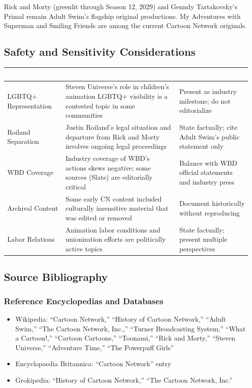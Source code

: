 \documentclass[11pt,letterpaper]{article}
\newcommand{\tableheader}[1]{\textbf{\sffamily\textcolor{white}{#1}}}
\begin{document}
Rick and Morty (greenlit through Season 12, 2029) and Genndy Tartakovsky's Primal remain Adult Swim's flagship original productions. My Adventures with Superman and Smiling Friends are among the current Cartoon Network originals.

\subsection{Safety and Sensitivity Considerations}

\begin{center}
\begin{tabularx}{\textwidth}{L{3.5cm}XL{3cm}}
\toprule
{}
\tableheader{Area} & \tableheader{Consideration} & \tableheader{Handling} \\
\midrule
LGBTQ+ Representation & Steven Universe's role in children's animation LGBTQ+ visibility is a contested topic in some communities & Present as industry milestone; do not editorialize \\
Roiland Separation & Justin Roiland's legal situation and departure from Rick and Morty involves ongoing legal proceedings & State factually; cite Adult Swim's public statement only \\
WBD Coverage & Industry coverage of WBD's actions skews negative; some sources (Slate) are editorially critical & Balance with WBD official statements and industry press \\
Archival Content & Some early CN content included culturally insensitive material that was edited or removed & Document historically without reproducing \\
Labor Relations & Animation labor conditions and unionization efforts are politically active topics & State factually; present multiple perspectives \\
\bottomrule
\end{tabularx}
\end{center}

\subsection{Source Bibliography}

\subsubsection{Reference Encyclopedias and Databases}
\begin{itemize}
  \item Wikipedia: ``Cartoon Network,'' ``History of Cartoon Network,'' ``Adult Swim,'' ``The Cartoon Network, Inc.,'' ``Turner Broadcasting System,'' ``What a Cartoon!,'' ``Cartoon Cartoons,'' ``Toonami,'' ``Rick and Morty,'' ``Steven Universe,'' ``Adventure Time,'' ``The Powerpuff Girls''
  \item Encyclopaedia Britannica: ``Cartoon Network'' entry
  \item Grokipedia: ``History of Cartoon Network,'' ``The Cartoon Network, Inc.''
\end{itemize}
\end{document}
